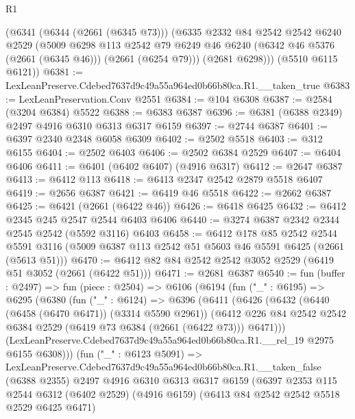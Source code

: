 \begin{lexlean}{R1}
\begin{coremodule}
      (@6341
        (@6344 (@2661 (@6345 @73)))
        (@6335
          @2332
          @84
          @2542
          @2542
          @6240
          @2529
          (@5009
            @6298
            @113
            @2542
            @79
            @6249
            @46
            @6240
            (@6342 @46 @5376 (@2661 (@6345 @46)))
            (@2661 (@6254 @79)))
          (@2681 @6298)))
      (@5510 @6115 @6121))
@6381 := LexLeanPreserve.Cdebed7637d9c49a55a964ed0b66b80ca.R1.__taken_true
@6383 := LexLeanPreservation.Conv @2551
@6384 := @104 @6308
@6387 := @2584 (@3204 @6384) @5522
@6388 := @6383 @6387
@6396 := @6381 (@6388 @2349) @2497 @4916 @6310 @6313 @6317 @6159
@6397 := @2744 @6387
@6401 := @6397 @2340 @2348 @6058 @6309
@6402 := @2502 @5518
@6403 := @312 @6155
@6404 := @2502 @6403
@6406 := @2502 @6384 @2529
@6407 := @6404 @6406
@6411 := @6401 (@6402 @6407) (@4916 @6317)
@6412 := @2647 @6387
@6413 := @6412 @113
@6418 := @6413 @2347 @2542 @2879 @5518 @6407
@6419 := @2656 @6387
@6421 := @6419 @46 @5518
@6422 := @2662 @6387
@6425 := @6421 (@2661 (@6422 @46))
@6426 := @6418 @6425
@6432 := @6412 @2345 @245 @2547 @2544 @6403 @6406
@6440 := @3274 @6387 @2342 @2344 @2545 @2542 (@5592 @3116) @6403
@6458 := @6412
    @178
    @85
    @2542
    @2544
    @5591
    @3116
    (@5009 @6387 @113 @2542 @51 @5603 @46 @5591 @6425 (@2661 (@5613 @51)))
@6470 := @6412 @82 @84 @2542 @2542 @3052 @2529 (@6419 @51 @3052 (@2661 (@6422 @51)))
@6471 := @2681 @6387
@6540 := fun (buffer : @2497) =>
  fun (piece : @2504) =>
  @6106
    (@6194
      (fun ("_" : @6195) =>
      @6295
        (@6380
          (fun ("_" : @6124) =>
          @6396
            (@6411
              (@6426
                (@6432
                  (@6440 (@6458 (@6470 @6471)) (@3314 @5590 @2961))
                  (@6412
                    @226
                    @84
                    @2542
                    @2542
                    @6384
                    @2529
                    (@6419 @73 @6384 (@2661 (@6422 @73)))
                    @6471)))
              (LexLeanPreserve.Cdebed7637d9c49a55a964ed0b66b80ca.R1.__rel_19 @2975 @6155 @6308)))
          (fun ("_" : @6123 @5091) =>
          LexLeanPreserve.Cdebed7637d9c49a55a964ed0b66b80ca.R1.__taken_false
            (@6388 @2355)
            @2497
            @4916
            @6310
            @6313
            @6317
            @6159
            (@6397
              @2353
              @115
              @2544
              @6312
              (@6402 @2529)
              (@4916 @6159)
              (@6413 @84 @2542 @2542 @5518 @2529 @6425 @6471)

\end{coremodule}
\end{lexlean}

